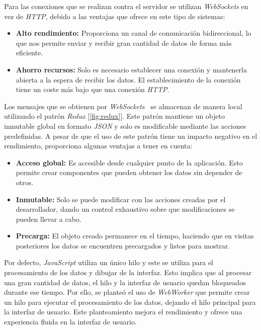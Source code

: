 Para las conexiones que se realizan contra el servidor se utilizan \textit{WebSockets} en vez de \textit{HTTP}, debido a las ventajas que ofrece en este tipo de sistemas:

\begin{itemize}[noitemsep]
    \item \textbf{Alto rendimiento:} Proporciona un canal de comunicación bidireccional, lo que nos permite enviar y recibir gran cantidad de datos de forma más eficiente.
    \item \textbf{Ahorro recursos:} Solo es necesario establecer una conexión y mantenerla abierta a la espera de recibir los datos. El establecimiento de la conexión tiene un coste más bajo que una conexión \textit{HTTP}.
\end{itemize}


Los mensajes que se obtienen por \textit{WebSockets}~\cite{ConsumeApache} se almacenan de manera local utilizando el patrón \textit{Redux} [\cref{fig:redux}]. Este patrón mantiene un objeto inmutable global en formato \textit{JSON} y solo es modificable mediante las acciones predefinidas. A pesar de que el uso de este patrón tiene un impacto negativo en el rendimiento, proporciona algunas ventajas a tener en cuenta:

\begin{itemize}[noitemsep]
    \item \textbf{Acceso global:} Es accesible desde cualquier punto de la aplicación. Esto permite crear componentes que pueden obtener los datos sin depender de otros.
    \item \textbf{Inmutable:} Solo se puede modificar con las acciones creadas por el desarrollador, dando un control exhaustivo sobre que modificaciones se pueden llevar a cabo.
    \item \textbf{Precarga:} El objeto creado permanece en el tiempo, haciendo que en visitas posteriores los datos se encuentren precargados y listos para mostrar.
\end{itemize}



Por defecto, \textit{JavaScript} utiliza un único hilo y este se utiliza para el procesamiento de los datos y dibujar de la interfaz. Esto implica que al procesar una gran cantidad de datos, el hilo y la interfaz de usuario quedan bloqueados durante ese tiempo. Por ello, se planteó el uso de \textit{WebWorker} que permite crear un hilo para ejecutar el procesamiento de los datos, dejando el hilo principal para la interfaz de usuario. Este planteamiento mejora el rendimiento y ofrece una experiencia fluida en la interfaz de usuario.


